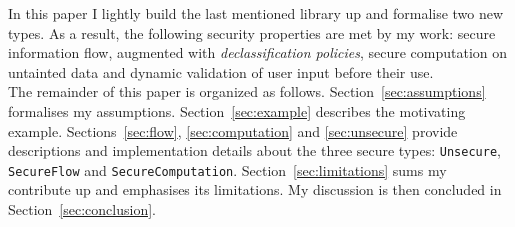 In this paper I lightly build the last mentioned library up and formalise two new types. As a result, the following security properties are met by my work: secure information flow, augmented with \textit{declassification policies}, secure computation on untainted data and dynamic validation of user input before their use. \\
The remainder of this paper is organized as follows. Section~\ref{sec:assumptions} formalises my assumptions. Section~\ref{sec:example} describes the motivating example. Sections~\ref{sec:flow}, \ref{sec:computation} and \ref{sec:unsecure} provide descriptions and implementation details about the three secure types: \texttt{Unsecure}, \texttt{SecureFlow} and \texttt{SecureComputation}. Section~\ref{sec:limitations} sums my contribute up and emphasises its limitations. My discussion is then concluded in Section~\ref{sec:conclusion}.